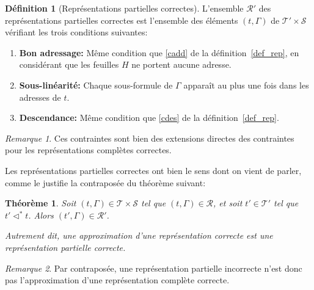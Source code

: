 \documentclass[11pt,a4paper]{article}
\theoremstyle{plain}
\newtheorem{theorem}{Théorème}
\theoremstyle{definition}
\newtheorem{definition}{Définition}
\theoremstyle{remark}
\newtheorem{remark}{Remarque}
\newcommand*{\sequent}{\Gamma}
\newcommand*{\sequents}{\ensuremath{\mathcal{S}}}
\newcommand*{\trees}{\ensuremath{\mathcal{T}}}
\newcommand*{\treespartial}{\ensuremath{\mathcal{T'}}}
\newcommand*{\representationslarge}{\ensuremath{\trees \times \sequents}}
\newcommand*{\representations}{\ensuremath{\mathcal{R}}}
\newcommand*{\representationspartiallarge}{\ensuremath{\treespartial \times \sequents}}
\newcommand*{\representationspartial}{\ensuremath{\mathcal{R'}}}
\newcommand*{\relapprox}{\ensuremath{\triangleleft}}
\newcommand*{\relapproxlarge}{\ensuremath{\relapprox^*}}
\newcommand*{\unknown}{H}
\newcommand*{\caddpartial}{(a)}
\newcommand*{\clinpartial}{(b')}
\newcommand*{\cdespartial}{(c)}
\begin{document}
\begin{definition}[Représentations partielles correctes]
    \label{def_rep_partial}
    L'ensemble \representationspartial{} des représentations partielles correctes est l'ensemble des éléments $(t, \sequent)$ de $\representationspartiallarge$ vérifiant les trois conditions suivantes:
    
    \begin{enumerate}
    \item[\caddpartial] \textbf{Bon adressage:} Même condition que \ref{cadd} de la définition~\ref{def_rep}, en considérant que les feuilles $\unknown$ ne portent aucune adresse.
    \item[\clinpartial] \textbf{Sous-linéarité:} Chaque sous-formule de $\sequent$ apparaît au plus une fois dans les adresses de $t$.
    \item[\cdespartial] \textbf{Descendance:} Même condition que \ref{cdes} de la définition~\ref{def_rep}.
    \end{enumerate}
\end{definition}

\begin{remark}
    Ces contraintes sont bien des extensions directes des contraintes pour les représentations complètes correctes.
\end{remark}

Les représentations partielles correctes ont bien le sens dont on vient de parler, comme le justifie la contraposée du théorème suivant:

\begin{theorem}
    \label{approxofcorrect}
    Soit $(t, \sequent) \in \representationslarge$ tel que $(t, \sequent) \in \representations$, et soit $t' \in \treespartial$ tel que $t' \relapproxlarge t$. Alors $(t', \sequent) \in \representationspartial$.
    
    Autrement dit, une approximation d'une représentation correcte est une représentation partielle correcte.
\end{theorem}

\begin{remark}
    Par contraposée, une représentation partielle incorrecte n'est donc pas l'approximation d'une représentation complète correcte.
\end{remark}
\end{document}
